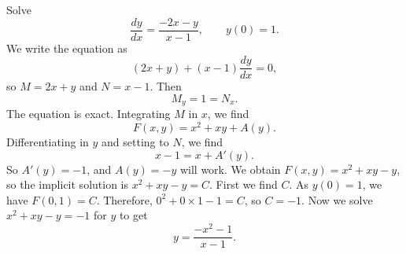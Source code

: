\begin{example}
Solve
\begin{equation*}
\frac{dy}{dx} = \frac{-2x-y}{x-1}, \qquad y(0) = 1.
\end{equation*}
We write the equation as
\begin{equation*}
(2x+y) + (x-1)\frac{dy}{dx} = 0 ,
\end{equation*}
so $M = 2x+y$ and $N = x-1$.  Then
\begin{equation*}
M_y = 1 = N_x .
\end{equation*}
The equation is exact.
Integrating $M$ in $x$, we find
\begin{equation*}
F(x,y) = x^2+xy + A(y) .
\end{equation*}
Differentiating in $y$ and setting to $N$, we find
\begin{equation*}
x-1 = x + A'(y) .
\end{equation*}
So $A'(y) = -1$, and $A(y) = -y$ will work.  We obtain $F(x,y) = x^2+xy-y$, so
the implicit solution is $x^2+xy-y = C$.  First we find $C$.  As $y(0)=1$, we have
$F(0,1) = C$.  Therefore, $0^2+0\times 1 - 1 = C$, so $C=-1$.  Now we solve
$x^2+xy-y = -1$ for $y$ to get
\begin{equation*}
y = \frac{-x^2-1}{x-1} .
\end{equation*}
\end{example}

